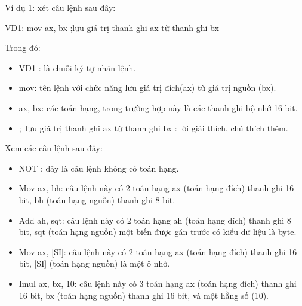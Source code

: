 	Ví dụ 1: xét câu lệnh sau đây: 
	 \begin{center}		 
		VD1: mov ax, bx	;lưu giá trị thanh ghi ax từ thanh ghi bx
	\end{center}
	Trong đó:
	\begin{itemize}
		\renewcommand{\labelitemi}{\textbullet}			
	  \item	VD1 : là chuỗi ký tự nhãn lệnh.
	\item	mov: tên lệnh với chức năng lưu giá trị đích(ax) từ giá trị nguồn (bx).
	\item	ax, bx: các toán hạng, trong trường hợp này là các thanh ghi bộ nhớ 16 bit.
	\item $;$ lưu giá trị thanh ghi ax từ thanh ghi bx : lời giải thích, chú thích thêm.
	\end{itemize}
	
	Xem các câu lệnh sau đây:
	\begin{itemize}
	\renewcommand{\labelitemi}{\textbullet}		
	\item  NOT	: đây là câu lệnh không có toán hạng.
	\item	Mov ax, bh: câu lệnh này có 2 toán hạng ax (toán hạng đích) thanh ghi 16 bit, bh (toán hạng nguồn) thanh ghi 8 bit.
	\item	Add ah, sqt: câu lệnh này có 2 toán hạng ah (toán hạng đích) thanh ghi 8 bit, sqt (toán hạng nguồn) một biến được gán trước có kiểu dữ liệu là byte.
	\item	Mov ax, [SI]: câu lệnh này có 2 toán hạng ax (toán hạng đích) thanh ghi 16 bit, [SI] (toán hạng nguồn) là một ô nhớ.
	\item	Imul ax, bx, 10: câu lệnh này có 3 toán hạng ax (toán hạng đích) thanh ghi 16 bit, bx (toán hạng nguồn) thanh ghi 16 bit, và một hằng số (10).
	\end{itemize}

